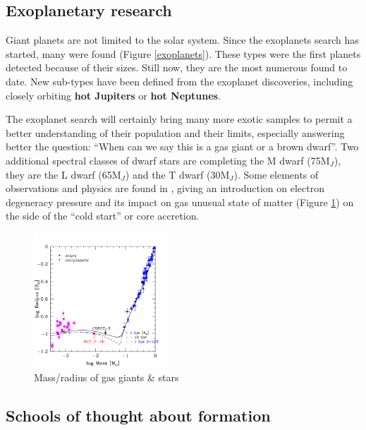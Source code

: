 \documentclass[12pt]{article} %
\begin{document}
\subsection{Exoplanetary research}\vspace{-1ex}\bigskip

Giant planets are not limited to the solar system. Since the exoplanets search has started, many were found (Figure \ref{exoplanets}). These types were the first planets detected because of their sizes. Still now, they are the most numerous found to date. New sub-types have been defined from the exoplanet discoveries, including closely orbiting \textbf{hot Jupiters} or \textbf{hot Neptunes}.\newline

\noindent The exoplanet search will certainly bring many more exotic samples to permit a better understanding of their population and their limits, especially answering better the question: ``When can we say this is a gas giant or a brown dwarf''. Two additional spectral classes of dwarf stars are completing the M dwarf (75M$_J$), they are the L dwarf (65M$_J$) and the T dwarf (30M$_J$). Some elements of observations and physics are found in \cite{Jeffries:2015:Online}, giving an introduction on electron degeneracy pressure and its impact on gas unusual state of matter (Figure \ref{gas_giants_vs_stars}) on the side of the ``cold start'' or core accretion.

\begin{figure}
\begin{center}
 \includegraphics[width=0.45\textwidth,keepaspectratio=true]{./images/physics_stackexchange_com_questions_165283_gas_giant_six_times_more_massive}
 \caption{Mass/radius of gas giants \& stars \cite{Jeffries:2015:Online}}
 \label{gas_giants_vs_stars}
\end{center}
\end{figure}


\subsection{Schools of thought about formation}\vspace{-1ex}\bigskip
\end{document}
